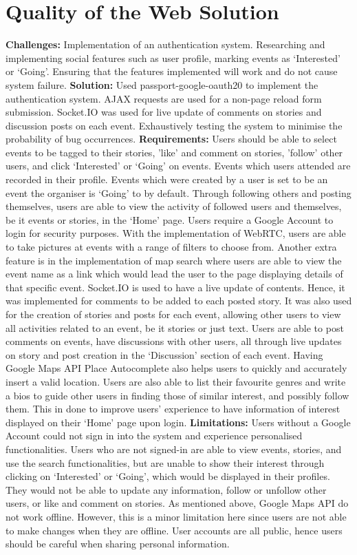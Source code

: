 \documentclass[11pt, a4paper]{article}
\begin{document}
\section{Quality of the Web Solution}
\textbf{Challenges:} Implementation of an authentication system. Researching and implementing social
features such as user profile, marking events as `Interested' or `Going'. Ensuring that the features
implemented will work and do not cause system failure. \textbf{Solution:} Used
passport-google-oauth20 \cite{passport_google} to implement the authentication system. AJAX
requests are used for a non-page reload form submission. Socket.IO was used for live update of
comments on stories and discussion posts on each event. Exhaustively testing the system to
minimise the probability of bug occurrences. \textbf{Requirements:} Users should be able to select
events to be tagged to their stories, 'like' and comment on stories, 'follow' other users, and click
`Interested' or `Going' on events. Events which users attended are recorded in their profile. Events
which were created by a user is set to be an event the organiser is `Going' to by default. Through
following others and posting themselves, users are able to view the activity of followed users and
themselves, be it events or stories, in the `Home' page. Users require a Google Account to login
for security purposes. With the implementation of WebRTC, users are able to take pictures at events 
with a range of filters to choose from. Another extra feature is in the implementation of map search
where users are able to view the event name as a link which would lead the user to the page
displaying details of that specific event. Socket.IO is used to have a live update of contents.
Hence, it was implemented for comments to be added to each posted story. It was also used for the
creation of stories and posts for each event, allowing other users to view all activities related
to an event, be it stories or just text. Users are able to post comments on events, have
discussions with other users, all through live updates on story and post creation in the
`Discussion' section of each event. Having Google Maps API Place Autocomplete also helps users to 
quickly and accurately insert a valid location. Users are also able to list their favourite
genres and write a bios to guide other users in finding those of similar interest, and possibly
follow them. This in done to improve users' experience to have information of interest displayed
on their `Home' page upon login. \textbf{Limitations:} Users without a Google Account could not
sign in into the system and experience personalised functionalities. Users who are not signed-in are
able to view events, stories, and use the search functionalities, but are unable to show their
interest through clicking on `Interested' or `Going', which would be displayed in their profiles.
They would not be able to update any information, follow or unfollow other users, or like and
comment on stories. As mentioned above, Google Maps API do not work offline. However, this is a
minor limitation here since users are not able to make changes when they are offline. User accounts
are all public, hence users should be careful when sharing personal information.
\end{document}
